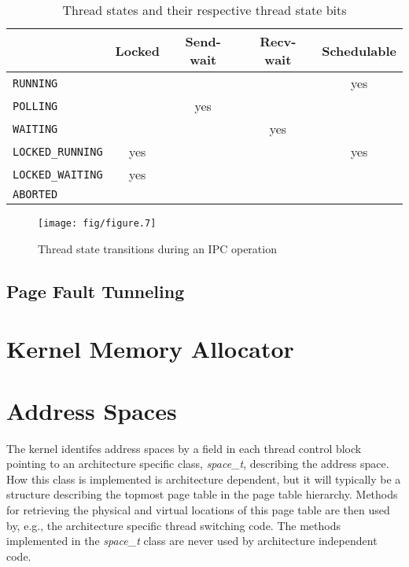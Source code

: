 \documentclass[a4paper,twoside]{book}
\newcommand{\state}[1]{\texttt{#1}}
\newcommand{\Type}[1]{\emph{#1}}
\begin{document}
\begin{table}[htbp]
  \begin{center}
    \begin{tabular}{|l|c|c|c|c|}
      \hhline{~----}
      \multicolumn{1}{c|}{} & Locked & Send-wait & Recv-wait & Schedulable \\
      \hline
      \state{RUNNING}         &     &     &     & yes \\
      \state{POLLING}         &     & yes &     &     \\
      \state{WAITING}         &     &     & yes &     \\
      \state{LOCKED\_RUNNING} & yes &     &     & yes \\
      \state{LOCKED\_WAITING} & yes &     &     &     \\
      \state{ABORTED}         &     &     &     &     \\
      \hline
    \end{tabular}
    \caption{Thread states and their respective thread state bits}
    \label{tab:thread-states}
  \end{center}
\end{table}


\begin{figure}[t]
  \begin{center}
    \texttt{[image: fig/figure.7]}
    \caption{Thread state transitions during an IPC operation}
    \label{fig:thread-states}
  \end{center}
\end{figure}

\subsection{Page Fault Tunneling}

\section{Kernel Memory Allocator}
\label{sec:Dynamic-kmem}


\section{Address Spaces}

The kernel identifes address spaces by a field in each thread control
block pointing to an architecture specific class, \Type{space\_t},
describing the address space.  How this class is implemented is
architecture dependent, but it will typically be a structure
describing the topmost page table in the page table hierarchy.
Methods for retrieving the physical and virtual locations of this page
table are then used by, e.g., the architecture specific thread
switching code.  The methods implemented in the \Type{space\_t} class
are never used by architecture independent code.
\end{document}
